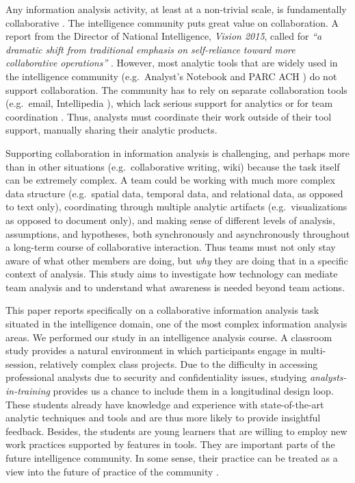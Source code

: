 Any information analysis activity, at least at a non-trivial scale, is
fundamentally collaborative \cite{Convertino2011}. The intelligence community
puts great value on collaboration. A report from the Director of National
Intelligence, \emph{Vision 2015},  called for \emph{``a dramatic shift from
traditional emphasis on self-reliance toward more collaborative operations''}
\cite[p.13]{Vision2015}. However, most analytic tools that are widely used in
the intelligence community (e.g.~Analyst's Notebook \cite{IBM} and PARC ACH
\cite{PARC}) do not support collaboration. The community has to rely on separate
collaboration tools (e.g.~email, Intellipedia \cite{Intelink2017}), which lack
serious support for analytics or for team coordination \cite{Treverton2016}. Thus,
analysts must coordinate their work outside of their tool support, manually
sharing their analytic products.

Supporting collaboration in information analysis is challenging, and perhaps
more than in other situations (e.g.~collaborative writing, wiki) because the task
itself can be extremely complex. A team could be working with much more complex
data structure (e.g.~spatial data, temporal data, and relational data, as
opposed to text only), coordinating through multiple analytic artifacts
(e.g.~visualizations as opposed to document only), and making
sense of different levels of analysis, assumptions, and hypotheses, both
synchronously and asynchronously throughout a long-term course of collaborative
interaction. Thus teams must not only stay aware of what other members are doing, but \emph{why} they are doing that in a specific context of analysis. This study aims to investigate how technology can mediate team analysis and to understand what awareness is needed beyond team actions.

This paper reports specifically on a collaborative information analysis task situated in the intelligence domain, one of the most complex information analysis areas. We performed our study in an intelligence analysis course.
A classroom study provides a natural environment in which participants engage
in multi-session, relatively complex class projects. Due to the difficulty in
accessing professional analysts due to security and confidentiality issues,
studying \emph{analysts-in-training} provides us a chance to include them in a
longitudinal design loop. These students already have knowledge and experience
with state-of-the-art analytic techniques and tools and are thus more likely to
provide insightful feedback. Besides, the students are young learners that are
willing to employ new work practices supported by features in tools. They are
important parts of the future intelligence community. In some sense, their
practice can be treated as a view into the future of practice of the community
\cite{Martin2014}.

